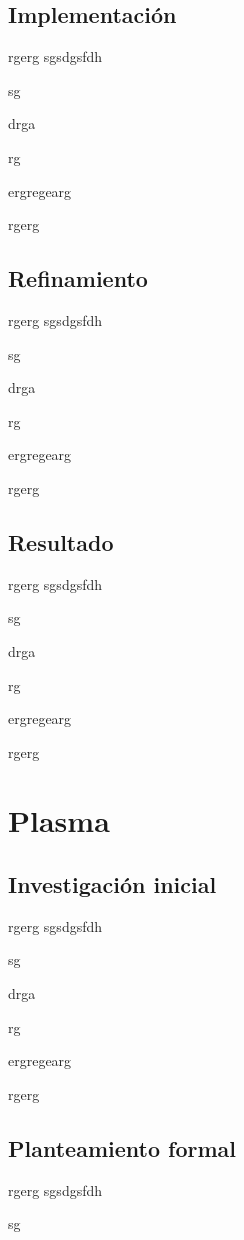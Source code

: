 \subsection{Implementación}

rgerg
sgsdgsfdh

sg

drga

rg

ergregearg

rgerg

\subsection{Refinamiento}

rgerg
sgsdgsfdh

sg

drga

rg

ergregearg

rgerg

\subsection{Resultado}

rgerg
sgsdgsfdh

sg

drga

rg

ergregearg

rgerg


\section{Plasma}

\subsection{Investigación inicial}

rgerg
sgsdgsfdh

sg

drga

rg

ergregearg

rgerg

\subsection{Planteamiento formal}

rgerg
sgsdgsfdh

sg

